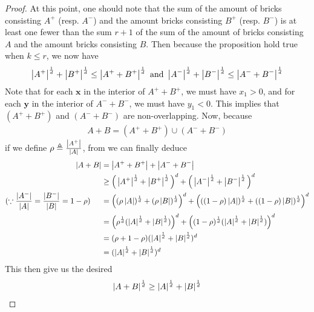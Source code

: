 \documentclass{report}
\begin{document}
\begin{proof}
At this point, one should note that the sum of the amount of bricks consisting $A^+$ (resp. $A^-$) and the amount bricks consisting $B^+$ (resp. $B^-$) is at least one fewer than the sum $r+1$ of the sum of the amount of bricks consisting $A$ and the amount bricks consisting $B$. Then because the proposition hold true when $k\leq r$, we now have
\begin{align*}
\left|A^+\right|^{\frac{1}{d}}+ \left|B^+\right|^{\frac{1}{d}}\leq \left|A^++B^+\right|^{\frac{1}{d}}\text{ and }\left|A^-\right|^{\frac{1}{d}}+ \left|B^-\right|^{\frac{1}{d}}\leq \left|A^-+B^-\right|^{\frac{1}{d}}
\end{align*}
Note that for each $\textbf{x}$ in the interior of $A^++B^+$, we must have  $x_1>0$, and for each  $\textbf{y}$ in the interior of $A^-+B^-$, we must have  $y_1<0$. This implies that  $(A^++B^+)$ and $(A^-+B^-)$ are non-overlapping. Now, because 
\begin{align*}
A+B =(A^++B^+)\cup (A^-+B^-)
\end{align*}
if we define $\rho \triangleq \frac{\left|A^+\right|}{\left|A\right|}$, from  we can finally deduce 
\begin{align*}
\left|A+B\right|&= \left|A^++B^+\right|+ \left|A^-+B^-\right|\\
&\geq \Big(\left|A^+\right|^{\frac{1}{d}} + \left|B^+\right|^{\frac{1}{d}} \Big)^{d} + \Big(\left|A^-\right|^{\frac{1}{d}}+\left|B^-\right|^{\frac{1}{d}}  \Big)^d \\ 
(\because \frac{\left|A^-\right|}{\left|A\right|}=\frac{\left|B^-\right|}{\left|B\right|}=1-\rho)\hspace{0.5cm}&=\Big((\rho \left|A\right|)^{\frac{1}{d}}+ (\rho \left|B\right|)^{\frac{1}{d}} \Big)^d + \Big(((1-\rho)\left|A\right|)^{\frac{1}{d}}+ ((1-\rho)\left|B\right|)^{\frac{1}{d}} \Big)^d \\
&=\Big(\rho^{\frac{1}{d}} (\left|A\right|^{\frac{1}{d}}+\left|B\right|^{\frac{1}{d}}) \Big)^d + \Big((1-\rho)^{\frac{1}{d}}(\left|A\right|^{\frac{1}{d}}+\left|B\right|^{\frac{1}{d}}) \Big)^{d}\\
&=(\rho + 1-\rho)(\left|A\right|^{\frac{1}{d}}+ \left|B\right|^{\frac{1}{d}})^d\\
&=(\left|A\right|^{\frac{1}{d}}+\left|B\right|^{\frac{1}{d}})^d
\end{align*}
This then give us the desired 
\begin{align*}
\left|A+B\right|^{\frac{1}{d}}\geq \left|A\right|^{\frac{1}{d}}+ \left|B\right|^{\frac{1}{d}}
\end{align*}














\end{proof}
\end{document}
